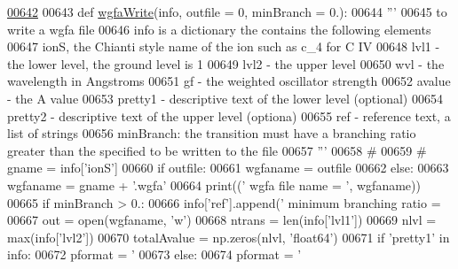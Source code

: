 \begin{DoxyCode}
\hypertarget{namespacepyneb_1_1utils_1_1__chianti__tools_l00642}{}\hyperlink{namespacepyneb_1_1utils_1_1__chianti__tools_a300c13ee6815450bc20d25a2c6dcb8a8}{00642} 
00643 \textcolor{keyword}{def }\hyperlink{namespacepyneb_1_1utils_1_1__chianti__tools_a300c13ee6815450bc20d25a2c6dcb8a8}{wgfaWrite}(info, outfile = 0, minBranch = 0.):
00644     \textcolor{stringliteral}{'''}
00645 \textcolor{stringliteral}{    to write a wgfa file}
00646 \textcolor{stringliteral}{    info is a dictionary the contains the following elements}
00647 \textcolor{stringliteral}{    ionS, the Chianti style name of the ion such as c\_4 for C IV}
00648 \textcolor{stringliteral}{    lvl1 - the lower level, the ground level is 1}
00649 \textcolor{stringliteral}{    lvl2 - the upper level}
00650 \textcolor{stringliteral}{    wvl - the wavelength in Angstroms}
00651 \textcolor{stringliteral}{    gf - the weighted oscillator strength}
00652 \textcolor{stringliteral}{    avalue - the A value}
00653 \textcolor{stringliteral}{    pretty1 - descriptive text of the lower level (optional)}
00654 \textcolor{stringliteral}{    pretty2 - descriptive text of the upper level (optiona)}
00655 \textcolor{stringliteral}{    ref - reference text, a list of strings}
00656 \textcolor{stringliteral}{    minBranch:  the transition must have a branching ratio greater than the specified to be written to the
       file}
00657 \textcolor{stringliteral}{    '''}
00658     \textcolor{comment}{#}
00659 \textcolor{comment}{#    gname = info['ionS']}
00660     \textcolor{keywordflow}{if} outfile:
00661         wgfaname = outfile
00662     \textcolor{keywordflow}{else}:
00663         wgfaname = gname + \textcolor{stringliteral}{'.wgfa'}
00664     print((\textcolor{stringliteral}{' wgfa file name = '}, wgfaname))
00665     \textcolor{keywordflow}{if} minBranch > 0.:
00666         info[\textcolor{stringliteral}{'ref'}].append(\textcolor{stringliteral}{' minimum branching ratio = %
00667     out = open(wgfaname, \textcolor{stringliteral}{'w'})
00668     ntrans = len(info[\textcolor{stringliteral}{'lvl1'}])
00669     nlvl = max(info[\textcolor{stringliteral}{'lvl2'}])
00670     totalAvalue = np.zeros(nlvl, \textcolor{stringliteral}{'float64'})
00671     \textcolor{keywordflow}{if} \textcolor{stringliteral}{'pretty1'} \textcolor{keywordflow}{in} info:
00672         pformat = \textcolor{stringliteral}{'%
00673     \textcolor{keywordflow}{else}:
00674         pformat = \textcolor{stringliteral}{'%
}}}
\end{DoxyCode}
